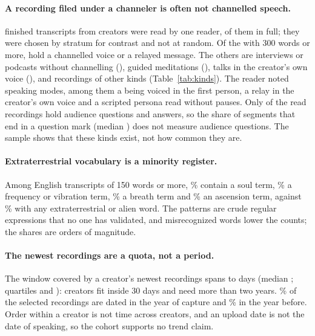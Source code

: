 \documentclass[letterpaper]{article} %
\begin{document}


\paragraph{A recording filed under a channeler is often not channelled speech.} \ReadN{} finished transcripts from \ReadCreators{} creators were read by one reader, \ReadFull{} of them in full; they were chosen by stratum for contrast and not at random. Of the \ReadLongN{} with 300 words or more, \KindChannelled{} hold a channelled voice or a relayed message. The others are interviews or podcasts without channelling (\KindInterview), guided meditations (\KindMeditation), talks in the creator's own voice (\KindOwnVoice), and \KindOther{} recordings of other kinds (Table~\ref{tab:kinds}). The reader noted \NSpeakingModes{} speaking modes, among them a being voiced in the first person, a relay in the creator's own voice and a scripted persona read without pauses. Only \ReadAudienceQA{} of the \ReadN{} read recordings hold audience questions and answers, so the share of segments that end in a question mark (median \QuestMed) does not measure audience questions. The sample shows that these kinds exist, not how common they are.

\paragraph{Extraterrestrial vocabulary is a minority register.} Among \TermBase{} English transcripts of 150 words or more, \TermSoul\% contain a soul term, \TermFrequency\% a frequency or vibration term, \TermBreath\% a breath term and \TermAscension\% an ascension term, against \TermExtraterrestrial\% with any extraterrestrial or alien word. The patterns are crude regular expressions that no one has validated, and misrecognized words lower the counts; the shares are orders of magnitude.

\paragraph{The newest \NPerCreator{} recordings are a quota, not a period.} The window covered by a creator's newest \NPerCreator{} recordings spans \SpanMin{} to \SpanMax{} days (median \SpanMed; quartiles \SpanQi{} and \SpanQiii): \NSpanWithinMonth{} creators fit inside 30 days and \NSpanOverTwoYears{} need more than two years. \PctDatedCaptureYear\% of the \NSelected{} selected recordings are dated in the year of capture and \PctDatedYearBefore\% in the year before. Order within a creator is not time across creators, and an upload date is not the date of speaking, so the cohort supports no trend claim.
\end{document}
